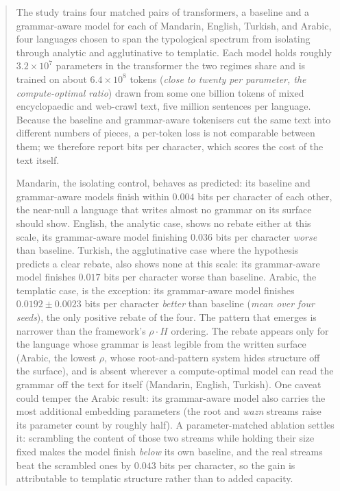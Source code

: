 \begin{abstract}
The study trains four matched pairs of transformers, a baseline and a grammar-aware model for each of Mandarin, English, Turkish, and Arabic, four languages chosen to span the typological spectrum from isolating through analytic and agglutinative to templatic. Each model holds roughly $3.2 \times 10^7$ parameters in the transformer the two regimes share and is trained on about $6.4 \times 10^8$ tokens (\emph{close to twenty per parameter, the compute-optimal ratio}) drawn from some one billion tokens of mixed encyclopaedic and web-crawl text, five million sentences per language. Because the baseline and grammar-aware tokenisers cut the same text into different numbers of pieces, a per-token loss is not comparable between them; we therefore report bits per character, which scores the cost of the text itself.

Mandarin, the isolating control, behaves as predicted: its baseline and grammar-aware models finish within $0.004$ bits per character of each other, the near-null a language that writes almost no grammar on its surface should show. English, the analytic case, shows no rebate either at this scale, its grammar-aware model finishing $0.036$ bits per character \emph{worse} than baseline. Turkish, the agglutinative case where the hypothesis predicts a clear rebate, also shows none at this scale: its grammar-aware model finishes $0.017$ bits per character worse than baseline. Arabic, the templatic case, is the exception: its grammar-aware model finishes $0.0192 \pm 0.0023$ bits per character \emph{better} than baseline (\emph{mean over four seeds}), the only positive rebate of the four. The pattern that emerges is narrower than the framework's $\rho \cdot H$ ordering. The rebate appears only for the language whose grammar is least legible from the written surface (Arabic, the lowest $\rho$, whose root-and-pattern system hides structure off the surface), and is absent wherever a compute-optimal model can read the grammar off the text for itself (Mandarin, English, Turkish). One caveat could temper the Arabic result: its grammar-aware model also carries the most additional embedding parameters (the root and \emph{wazn} streams raise its parameter count by roughly half). A parameter-matched ablation settles it: scrambling the content of those two streams while holding their size fixed makes the model finish \emph{below} its own baseline, and the real streams beat the scrambled ones by $0.043$ bits per character, so the gain is attributable to templatic structure rather than to added capacity.


\end{abstract}
